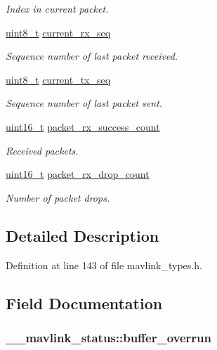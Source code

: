 \begin{DoxyCompactItemize}
\begin{DoxyCompactList}\small\item\em Index in current packet. \end{DoxyCompactList}\item 
\hyperlink{stdint_8h_aba7bc1797add20fe3efdf37ced1182c5}{uint8\-\_\-t} \hyperlink{struct____mavlink__status_affbdd32b3dff8ae35327a79ed6b17646}{current\-\_\-rx\-\_\-seq}
\begin{DoxyCompactList}\small\item\em Sequence number of last packet received. \end{DoxyCompactList}\item 
\hyperlink{stdint_8h_aba7bc1797add20fe3efdf37ced1182c5}{uint8\-\_\-t} \hyperlink{struct____mavlink__status_a06482d6c3fbfa829526c9b2e2e895f32}{current\-\_\-tx\-\_\-seq}
\begin{DoxyCompactList}\small\item\em Sequence number of last packet sent. \end{DoxyCompactList}\item 
\hyperlink{stdint_8h_a273cf69d639a59973b6019625df33e30}{uint16\-\_\-t} \hyperlink{struct____mavlink__status_aa088f67773cdf9ff541c5880e65cee68}{packet\-\_\-rx\-\_\-success\-\_\-count}
\begin{DoxyCompactList}\small\item\em Received packets. \end{DoxyCompactList}\item 
\hyperlink{stdint_8h_a273cf69d639a59973b6019625df33e30}{uint16\-\_\-t} \hyperlink{struct____mavlink__status_a1a1f510b9484e705c971f20fd1d61912}{packet\-\_\-rx\-\_\-drop\-\_\-count}
\begin{DoxyCompactList}\small\item\em Number of packet drops. \end{DoxyCompactList}\end{DoxyCompactItemize}


\subsection{Detailed Description}


Definition at line 143 of file mavlink\-\_\-types.\-h.



\subsection{Field Documentation}
\hypertarget{struct____mavlink__status_ae0ceb5a136021ee78c953f2e86d772cb}{
\subsubsection[{buffer\-\_\-overrun}]{ \-\_\-\-\_\-mavlink\-\_\-status\-::buffer\-\_\-overrun}}\label{struct____mavlink__status_ae0ceb5a136021ee78c953f2e86d772cb}


